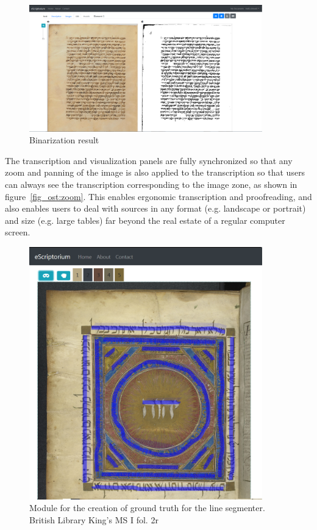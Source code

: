 \begin{figure}
	\centering
	\includegraphics[width=0.9\textwidth]{binarization_example.png}
	\caption{Binarization result}
\end{figure}

The transcription and visualization panels are fully synchronized so that any
zoom and panning of the image is also applied to the transcription so that
users can always see the transcription corresponding to the image zone, as
shown in figure~\ref{fig_ost:zoom}. This enables ergonomic transcription and
proofreading, and also enables users to deal with sources in any format (e.g.
landscape or portrait) and size (e.g. large tables) far beyond the real estate
of a regular computer screen.

\begin{figure}
	\centering
	\includegraphics[width=0.9\textwidth]{spanish.png}
	\caption{Module for the creation of ground truth for the line segmenter. British Library King’s MS I fol. 2r}
	\label{fig_ost:baseline}
\end{figure}

